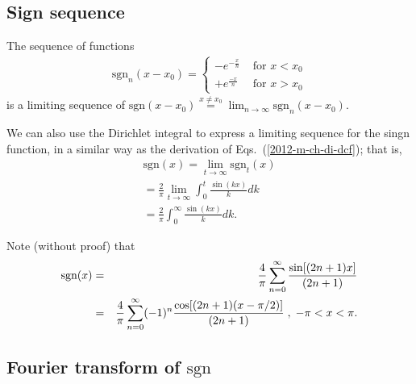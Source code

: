 \subsection{Sign sequence}


The sequence of functions
\begin{equation}
\begin{split}
\textrm{sgn}_n(x-x_0)
=
\left\{
\begin{array}{rl}
- e^{-\frac{x}{n}}&\textrm{ for } x < x_0\\
+ e^{\frac{-x}{n}}&\textrm{ for } x > x_0
\end{array}
\right.
\end{split}
\label{2012-m-ch-di-lsegn}
\end{equation}
is a limiting sequence of
$
\textrm{sgn}(x-x_0)\stackrel{x\neq x_0}{=} \lim_{n\rightarrow \infty} \textrm{sgn}_n(x-x_0)
$.


We can also use the Dirichlet integral
to express a limiting sequence for the singn function,
in a similar way as the derivation of Eqs.~(\ref{2012-m-ch-di-dcf}); that is,
\begin{equation}
\begin{split}
\textrm{sgn}(x)= \lim_{t \rightarrow \infty} \textrm{sgn}_t (x)
\\
= \frac{2}{\pi }\lim_{t \rightarrow \infty}\int_0^t \frac{\sin (kx)}{k} dk
\\
=
\frac{2}{\pi }\int_0^\infty \frac{\sin (kx)}{k} dk
.
\end{split}
\label{2015-m-ch-di-sign}
\end{equation}

Note (without proof) that
\begin{eqnarray}
\mbox{sgn}(x)
&=&{4\over \pi }\sum_{n=0}^\infty {\sin [
(2n+1)x]\over
(2n+1)}\\
&=&{4\over \pi }\sum_{n=0}^\infty (-1)^n{\cos [
(2n+1)(x-\pi /2)]\over
(2n+1)}\;,\; -\pi <x<\pi  .
 \end{eqnarray}




\subsection{Fourier transform of $\textrm{sgn}$}


